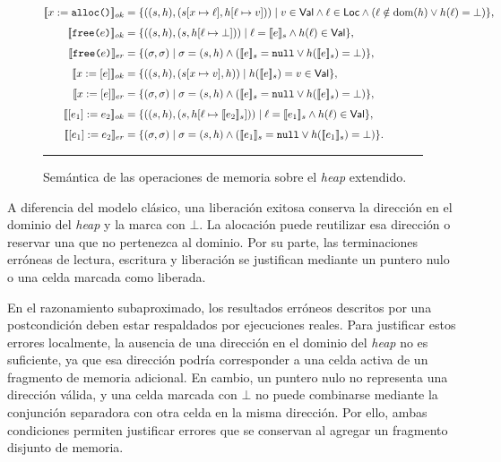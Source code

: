 \documentclass[a4paper,	11pt]{report}
\begin{document}
\begin{figure}[htbp]
\centering
\begin{minipage}{0.98\textwidth}
\small
$$
\begin{aligned}
\relax[\![x := \texttt{alloc()}]\!]_{ok} &= \{((s, h), (s[x \mapsto \ell], h[\ell \mapsto v]))
  \mid v \in \mathsf{Val} \land \ell \in \mathsf{Loc} \land (\ell \notin \operatorname{dom}(h) \lor h(\ell) = \bot)\}, \\[4pt]
[\![\texttt{free(}e\texttt{)}]\!]_{ok} &= \{((s,h), (s, h[\ell \mapsto \bot]))
  \mid \ell = [\![e]\!]_s \land h(\ell) \in \mathsf{Val}\}, \\[4pt]
[\![\texttt{free(}e\texttt{)}]\!]_{er} &= \{(\sigma, \sigma)
  \mid \sigma = (s, h) \land ([\![e]\!]_s = \texttt{null} \lor h([\![e]\!]_s) = \bot)\}, \\[4pt]
[\![x := [e]]\!]_{ok} &= \{((s, h), (s[x \mapsto v], h))
  \mid h([\![e]\!]_s) = v \in \mathsf{Val}\}, \\[4pt]
[\![x := [e]]\!]_{er} &= \{(\sigma, \sigma) \mid \sigma = (s, h) \land ([\![e]\!]_s = \texttt{null} \lor h([\![e]\!]_s) = \bot)\}, \\[4pt]
[\![[e_1] := e_2]\!]_{ok} &= \{((s, h), (s, h[\ell \mapsto [\![e_2]\!]_s]))
  \mid \ell = [\![e_1]\!]_s \land h(\ell) \in \mathsf{Val}\}, \\[4pt]
[\![[e_1] := e_2]\!]_{er} &= \{(\sigma, \sigma)
  \mid \sigma = (s, h) \land ([\![e_1]\!]_s = \texttt{null} \lor h([\![e_1]\!]_s) = \bot)\}.
\end{aligned}
$$
\vspace{0.1em}
\end{minipage}
\rule{\linewidth}{0.4pt}
\caption{Semántica de las operaciones de memoria sobre el \emph{heap} extendido.}
\label{fig:semantica-isl}
\end{figure}

A diferencia del modelo clásico,
una liberación exitosa conserva la dirección en el dominio del \emph{heap} y la marca con $\bot$.
La alocación puede reutilizar esa dirección o reservar una que no pertenezca al dominio.
Por su parte,
las terminaciones erróneas de lectura,
escritura y liberación se justifican mediante un puntero nulo o una celda marcada como liberada.

En el razonamiento subaproximado,
los resultados erróneos descritos por una postcondición deben estar respaldados por ejecuciones reales.
Para justificar estos errores localmente,
la ausencia de una dirección en el dominio del \emph{heap} no es suficiente,
ya que esa dirección podría corresponder a una celda activa de un fragmento de memoria adicional.
En cambio,
un puntero nulo no representa una dirección válida,
y una celda marcada con $\bot$ no puede combinarse mediante la conjunción separadora con otra celda en la misma dirección.
Por ello,
ambas condiciones permiten justificar errores que se conservan al agregar un fragmento disjunto de memoria.
\end{document}
